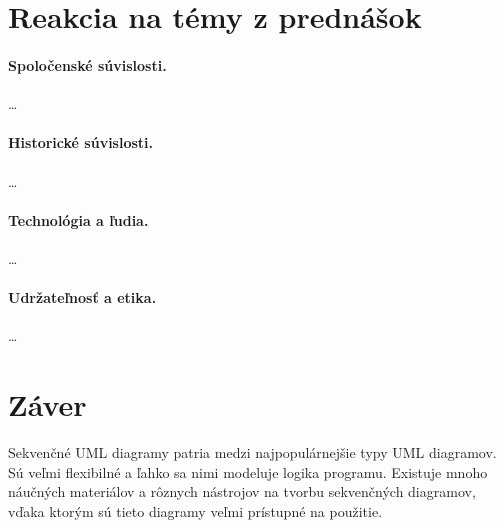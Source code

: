 \documentclass[10pt,slovak,a4paper]{article}
\begin{document}
\section{Reakcia na témy z prednášok} \label{lect}
\paragraph{Spoločenské súvislosti.}
\ldots

\paragraph{Historické súvislosti.}
\ldots

\paragraph{Technológia a ľudia.}
\ldots

\paragraph{Udržateľnosť a etika.}
\ldots

\section{Záver} \label{end}
Sekvenčné UML diagramy patria medzi najpopulárnejšie typy UML diagramov. Sú veľmi flexibilné a ľahko sa nimi modeluje logika programu. 
Existuje mnoho náučných materiálov a rôznych nástrojov na tvorbu sekvenčných diagramov, vďaka ktorým sú tieto diagramy veľmi prístupné na použitie. 


\end{document}
